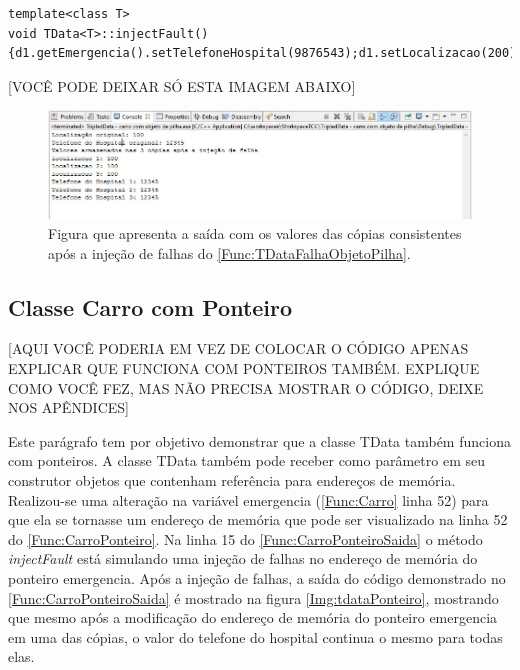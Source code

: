 \newpage

\begin{lstlisting}[label=Func:TDataFalhaObjetoPilha,caption={[Método utilizado para injetar falhas em uma das cópias da classe TData]. Método utilizado para injetar falhas em uma das cópias da classe TData. Este método pode ser implementado dentro da classe TData para simular um bit-flip.}]
template<class T>
void TData<T>::injectFault() {d1.getEmergencia().setTelefoneHospital(9876543);d1.setLocalizacao(200);}
\end{lstlisting}

[VOCÊ PODE DEIXAR SÓ ESTA IMAGEM ABAIXO]

\begin{figure}[H]
	\centering
	\includegraphics[width=1.0\textwidth]{figuras/tdataObjetoPilha.jpg}
	\caption[Figura que apresenta a saída com os valores das cópias consistentes após a injeção de falhas do \autoref{Func:TDataFalhaObjetoPilha}.]{Figura que apresenta a saída com os valores das cópias consistentes após a injeção de falhas do \autoref{Func:TDataFalhaObjetoPilha}.}
	\label{Img:tdataObjetoPilha}	
\end{figure}

\subsection{Classe Carro com Ponteiro} \label{subsec:CarroPonteiro}

[AQUI VOCÊ PODERIA EM VEZ DE COLOCAR O CÓDIGO APENAS EXPLICAR QUE FUNCIONA COM PONTEIROS TAMBÉM. EXPLIQUE COMO VOCÊ FEZ, MAS NÃO PRECISA MOSTRAR O CÓDIGO, DEIXE NOS APÊNDICES]

Este parágrafo tem por objetivo demonstrar que a classe TData também funciona com ponteiros. A classe TData também pode receber como parâmetro em seu construtor objetos que contenham referência para endereços de memória. Realizou-se uma alteração na variável emergencia (\autoref{Func:Carro} linha 52) para que ela se tornasse um  endereço de memória que pode ser visualizado na linha 52 do \autoref{Func:CarroPonteiro}. Na linha 15 do \autoref{Func:CarroPonteiroSaida} o método \textit{injectFault} está simulando uma injeção de falhas no endereço de memória do ponteiro emergencia. Após a injeção de falhas, a saída do código demonstrado no \autoref{Func:CarroPonteiroSaida} é mostrado na figura \ref{Img:tdataPonteiro}, mostrando que mesmo após a modificação do endereço de memória do ponteiro emergencia em uma das cópias, o valor do telefone do hospital continua o mesmo para todas elas.


